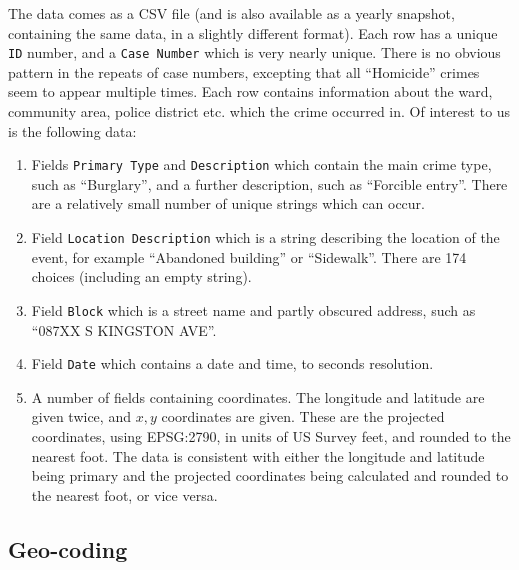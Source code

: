 \documentclass[twoside,a4paper,twocolumn,10pt]{article}
\theoremstyle{plain}
\theoremstyle{definition}
\begin{document}
The data comes as a CSV file (and is also available as a yearly snapshot, containing the
same data, in a slightly different format).  Each row has a unique \texttt{ID} number, and
a \texttt{Case Number} which is very nearly unique.  There is no obvious pattern in the repeats
of case numbers, excepting that all ``Homicide'' crimes seem to appear multiple times.
Each row contains information about the ward, community area, police district etc. which
the crime occurred in.  Of interest to us is the following data:
\begin{enumerate}
\item Fields \texttt{Primary Type} and \texttt{Description} which contain the main crime type,
such as ``Burglary'', and a further description, such as ``Forcible entry''.  There are a relatively
small number of unique strings which can occur.
\item Field \texttt{Location Description} which is a string describing the location of the
event, for example ``Abandoned building'' or ``Sidewalk''.  There are 174 choices (including
an empty string).
\item Field \texttt{Block} which is a street name and partly obscured address, such as
``087XX S KINGSTON AVE''.
\item Field \texttt{Date} which contains a date and time, to seconds resolution.
\item A number of fields containing coordinates.  The longitude and latitude are given twice,
and $x,y$ coordinates are given.  These are the projected coordinates, using EPSG:2790, in
units of US Survey feet, and rounded to the nearest foot.  The data is consistent with
either the longitude and latitude being primary and the projected coordinates being calculated
and rounded to the nearest foot, or vice versa.
\end{enumerate}



\subsection{Geo-coding}
\end{document}
